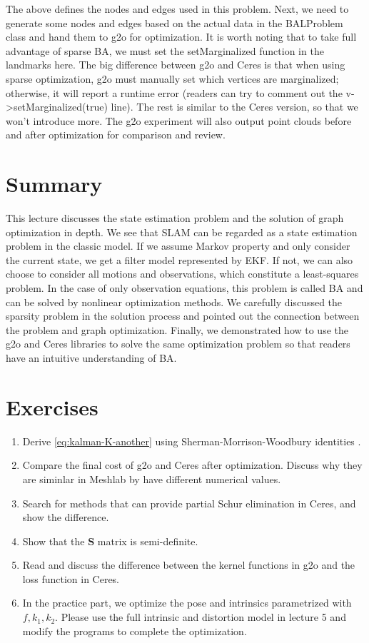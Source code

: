 The above defines the nodes and edges used in this problem. Next, we need to generate some nodes and edges based on the actual data in the BALProblem class and hand them to g2o for optimization. It is worth noting that to take full advantage of sparse BA, we must set the setMarginalized function in the landmarks here. The big difference between g2o and Ceres is that when using sparse optimization, g2o must manually set which vertices are marginalized; otherwise, it will report a runtime error (readers can try to comment out the v->setMarginalized(true) line). The rest is similar to the Ceres version, so that we won't introduce more. The g2o experiment will also output point clouds before and after optimization for comparison and review.

\section{Summary}
This lecture discusses the state estimation problem and the solution of graph optimization in depth. We see that SLAM can be regarded as a state estimation problem in the classic model. If we assume Markov property and only consider the current state, we get a filter model represented by EKF. If not, we can also choose to consider all motions and observations, which constitute a least-squares problem. In the case of only observation equations, this problem is called BA and can be solved by nonlinear optimization methods. We carefully discussed the sparsity problem in the solution process and pointed out the connection between the problem and graph optimization. Finally, we demonstrated how to use the g2o and Ceres libraries to solve the same optimization problem so that readers have an intuitive understanding of BA.

\section*{Exercises}
\begin{enumerate}
	\item Derive \eqref{eq:kalman-K-another} using Sherman-Morrison-Woodbury identities \cite{Sherman1950, Barfoot2016}.
	\item 
	Compare the final cost of g2o and Ceres after optimization. Discuss why they are siminlar in Meshlab by have different numerical values. 
	\item 
	Search for methods that can provide partial Schur elimination in Ceres, and show the difference. 
	\item Show that the $\mathbf{S}$ matrix is semi-definite. 
	\item Read \cite{Kummerle2011} and discuss the difference between the kernel functions in g2o and the loss function in Ceres. 
	\item[\optional] In the practice part, we optimize the pose and intrinsics parametrized with $f, k_1, k_2$. Please use the full intrinsic and distortion model in lecture 5 and modify the programs to complete the optimization. 
\end{enumerate}


